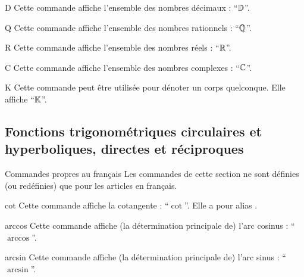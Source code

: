 \begin{docCommand}{D}{}
  Cette commande affiche l'ensemble des nombres décimaux : \enquote{$\mathbb{D}$}.
\end{docCommand}

\begin{docCommand}{Q}{}
  Cette commande affiche l'ensemble des nombres rationnels : \enquote{$\mathbb{Q}$}.
\end{docCommand}

\begin{docCommand}{R}{}
  Cette commande affiche l'ensemble des nombres réels : \enquote{$\mathbb{R}$}.
\end{docCommand}

\begin{docCommand}{C}{}
  Cette commande affiche l'ensemble des nombres complexes : \enquote{$\mathbb{C}$}.
\end{docCommand}

\begin{docCommand}{K}{}
  Cette commande peut être utilisée pour dénoter un corps quelconque. Elle
  affiche \enquote{$\mathbb{K}$}.
\end{docCommand}

\subsection[Fonctions trigonométriques circulaires et hyperboliques]{Fonctions
  trigonométriques circulaires et hyperboliques, directes et réciproques}

\begin{dbremark}{Commandes propres au français}{}
  Les commandes de cette section ne sont définies (ou redéfinies) que pour les
  articles en français.
\end{dbremark}

\begin{docCommand}{cot}{}
  Cette commande affiche la cotangente : \enquote{$\cot$}. Elle a pour alias
  .
\end{docCommand}

\begin{docCommand}{arccos}{}
  Cette commande affiche (la détermination principale de) l'arc cosinus :
  \enquote{$\arccos$}.
\end{docCommand}

\begin{docCommand}{arcsin}{}
  Cette commande affiche (la détermination principale de) l'arc sinus :
  \enquote{$\arcsin$}.
\end{docCommand}

